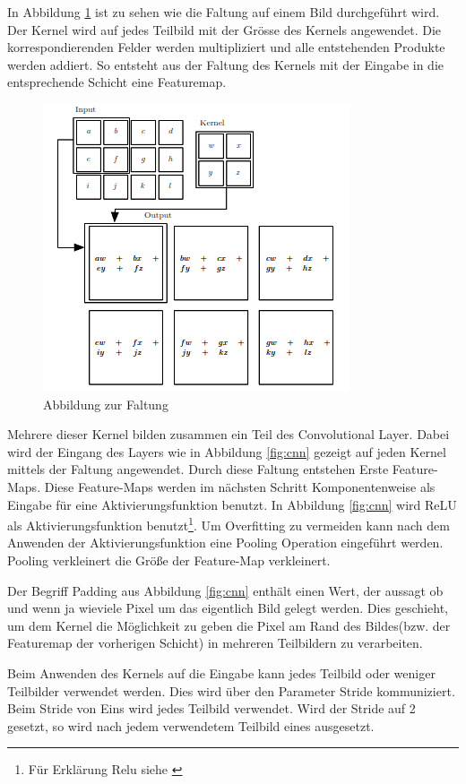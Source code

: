 In Abbildung \ref{fig:faltung} ist zu sehen wie die Faltung auf einem Bild durchgeführt wird. Der Kernel wird auf jedes Teilbild mit der Grösse des Kernels angewendet. Die korrespondierenden Felder werden multipliziert und alle entstehenden Produkte werden addiert. So entsteht aus der Faltung des Kernels mit der Eingabe in die entsprechende Schicht eine Featuremap.
\begin{figure}[H]
 \centering
 \includegraphics[width=0.45 \textwidth,keepaspectratio=true]{images/convolution.png}
 \caption{Abbildung zur Faltung \cite{CNNBook}}
 \label{fig:faltung}
\end{figure}
Mehrere dieser Kernel bilden zusammen ein Teil des Convolutional Layer. Dabei wird der Eingang des Layers wie in Abbildung \ref{fig:cnn} gezeigt auf jeden Kernel mittels der Faltung angewendet. Durch diese Faltung entstehen Erste Feature-Maps. Diese Feature-Maps werden im nächsten Schritt Komponentenweise als Eingabe für eine Aktivierungsfunktion benutzt. In Abbildung \ref{fig:cnn} wird ReLU als Aktivierungsfunktion benutzt\footnote{Für Erklärung Relu siehe \cite{neural}}. Um Overfitting zu vermeiden kann nach dem Anwenden der Aktivierungsfunktion eine Pooling Operation eingeführt werden. Pooling verkleinert die Größe der Feature-Map verkleinert.

Der Begriff Padding aus Abbildung \ref{fig:cnn} enthält einen Wert, der aussagt ob und wenn ja wieviele Pixel um das eigentlich Bild gelegt werden. Dies geschieht, um dem Kernel die Möglichkeit zu geben die Pixel am Rand des Bildes(bzw. der Featuremap der vorherigen Schicht) in mehreren Teilbildern zu verarbeiten.  

Beim Anwenden des Kernels auf die Eingabe kann jedes Teilbild oder weniger Teilbilder verwendet werden. Dies wird über den Parameter Stride kommuniziert. Beim Stride von Eins wird jedes Teilbild verwendet. Wird der Stride auf 2 gesetzt, so wird nach jedem verwendetem Teilbild eines ausgesetzt.


